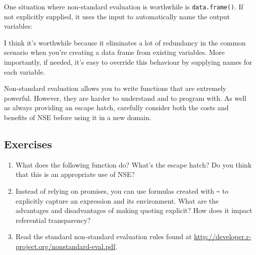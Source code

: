 One situation where non-standard evaluation is worthwhile is
\texttt{data.frame()}. If not explicitly supplied, it uses the input to
automatically name the output variables:

\begin{Shaded}
\begin{Highlighting}[]
\StringTok{ }
\StringTok{ }
\end{Highlighting}
\end{Shaded}

I think it's worthwhile because it eliminates a lot of redundancy in the
common scenario when you're creating a data frame from existing
variables. More importantly, if needed, it's easy to override this
behaviour by supplying names for each variable.

Non-standard evaluation allows you to write functions that are extremely
powerful. However, they are harder to understand and to program with. As
well as always providing an escape hatch, carefully consider both the
costs and benefits of NSE before using it in a new domain.

\subsection{Exercises}

\begin{enumerate}
\def\labelenumi{\arabic{enumi}.}
\item
  What does the following function do? What's the escape hatch? Do you
  think that this is an appropriate use of NSE?

\begin{Shaded}
\begin{Highlighting}[]
\StringTok{ }
  \StringTok{ }
  \NormalTok{())}
\NormalTok{\}}
\end{Highlighting}
\end{Shaded}
\item
  Instead of relying on promises, you can use formulas created with
  \texttt{\textasciitilde{}} to explicitly capture an expression and its
  environment. What are the advantages and disadvantages of making
  quoting explicit? How does it impact referential transparency?
\item
  Read the standard non-standard evaluation rules found at
  \url{http://developer.r-project.org/nonstandard-eval.pdf}.
\end{enumerate}
